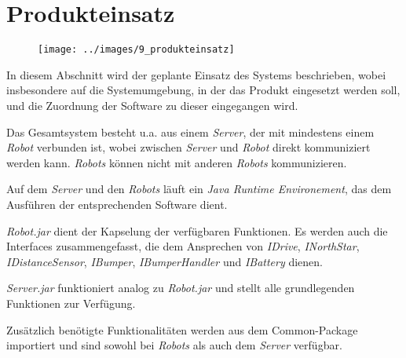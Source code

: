 \section{Produkteinsatz}

\begin{figure}[H]
\centering
\texttt{[image: ../images/9\_produkteinsatz]}
\label{Produkteinsatz}
\end{figure}

In diesem Abschnitt wird der geplante Einsatz des Systems beschrieben, wobei insbesondere auf die Systemumgebung, in der das Produkt eingesetzt werden soll, und die Zuordnung der Software zu dieser eingegangen wird.

Das Gesamtsystem besteht u.a. aus einem \emph{Server}, der mit mindestens einem \emph{Robot} verbunden ist, wobei zwischen \emph{Server} und \emph{Robot} direkt kommuniziert werden kann. \emph{Robots} können nicht mit anderen \emph{Robots} kommunizieren.

Auf dem \emph{Server} und den \emph{Robots} läuft ein \emph{Java Runtime Environement}, das dem Ausführen der entsprechenden Software dient.

\emph{Robot.jar} dient der Kapselung der verfügbaren Funktionen. Es werden auch die Interfaces zusammengefasst, die dem Ansprechen von \emph{IDrive}, \emph{INorthStar}, \emph{IDistanceSensor}, \emph{IBumper}, \emph{IBumperHandler} und \emph{IBattery} dienen.

\emph{Server.jar} funktioniert analog zu \emph{Robot.jar} und stellt alle grundlegenden Funktionen zur Verfügung.

Zusätzlich benötigte Funktionalitäten werden aus dem Common-Package importiert und sind sowohl bei \emph{Robots} als auch dem \emph{Server} verfügbar.
